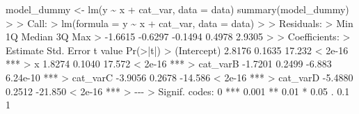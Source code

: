 \documentclass[
  letterpaper,
]{book}
\newenvironment{Shaded}{\begin{snugshade}}{\end{snugshade}}
\newcommand{\AttributeTok}[1]{\textcolor[rgb]{0.40,0.45,0.13}{#1}}
\newcommand{\DecValTok}[1]{\textcolor[rgb]{0.68,0.00,0.00}{#1}}
\newcommand{\ErrorTok}[1]{\textcolor[rgb]{0.68,0.00,0.00}{#1}}
\newcommand{\FloatTok}[1]{\textcolor[rgb]{0.68,0.00,0.00}{#1}}
\newcommand{\FunctionTok}[1]{\textcolor[rgb]{0.28,0.35,0.67}{#1}}
\newcommand{\NormalTok}[1]{\textcolor[rgb]{0.00,0.23,0.31}{#1}}
\newcommand{\OtherTok}[1]{\textcolor[rgb]{0.00,0.23,0.31}{#1}}
\newcommand{\SpecialCharTok}[1]{\textcolor[rgb]{0.37,0.37,0.37}{#1}}
\newcommand{\StringTok}[1]{\textcolor[rgb]{0.13,0.47,0.30}{#1}}
\begin{document}
\begin{Shaded}
\begin{Highlighting}[]
\NormalTok{model\_dummy }\OtherTok{\textless{}{-}} \FunctionTok{lm}\NormalTok{(y }\SpecialCharTok{\textasciitilde{}}\NormalTok{ x }\SpecialCharTok{+}\NormalTok{ cat\_var, }\AttributeTok{data =}\NormalTok{ data)}
\FunctionTok{summary}\NormalTok{(model\_dummy)}
\SpecialCharTok{\textgreater{}} 
\ErrorTok{\textgreater{}}\NormalTok{ Call}\SpecialCharTok{:}
\ErrorTok{\textgreater{}} \FunctionTok{lm}\NormalTok{(}\AttributeTok{formula =}\NormalTok{ y }\SpecialCharTok{\textasciitilde{}}\NormalTok{ x }\SpecialCharTok{+}\NormalTok{ cat\_var, }\AttributeTok{data =}\NormalTok{ data)}
\SpecialCharTok{\textgreater{}} 
\ErrorTok{\textgreater{}}\NormalTok{ Residuals}\SpecialCharTok{:}
\ErrorTok{\textgreater{}}\NormalTok{     Min      }\DecValTok{1}\NormalTok{Q  Median      }\DecValTok{3}\NormalTok{Q     Max }
\SpecialCharTok{\textgreater{}} \SpecialCharTok{{-}}\FloatTok{1.6615} \SpecialCharTok{{-}}\FloatTok{0.6297} \SpecialCharTok{{-}}\FloatTok{0.1494}  \FloatTok{0.4978}  \FloatTok{2.9305} 
\SpecialCharTok{\textgreater{}} 
\ErrorTok{\textgreater{}}\NormalTok{ Coefficients}\SpecialCharTok{:}
\ErrorTok{\textgreater{}}\NormalTok{             Estimate Std. Error t value }\FunctionTok{Pr}\NormalTok{(}\SpecialCharTok{\textgreater{}}\ErrorTok{|}\NormalTok{t}\SpecialCharTok{|}\NormalTok{)    }
\SpecialCharTok{\textgreater{}}\NormalTok{ (Intercept)   }\FloatTok{2.8176}     \FloatTok{0.1635}  \FloatTok{17.232}  \SpecialCharTok{\textless{}} \FloatTok{2e{-}16} \SpecialCharTok{**}\ErrorTok{*}
\ErrorTok{\textgreater{}}\NormalTok{ x             }\FloatTok{1.8274}     \FloatTok{0.1040}  \FloatTok{17.572}  \SpecialCharTok{\textless{}} \FloatTok{2e{-}16} \SpecialCharTok{**}\ErrorTok{*}
\ErrorTok{\textgreater{}}\NormalTok{ cat\_varB     }\SpecialCharTok{{-}}\FloatTok{1.7201}     \FloatTok{0.2499}  \SpecialCharTok{{-}}\FloatTok{6.883} \FloatTok{6.24e{-}10} \SpecialCharTok{**}\ErrorTok{*}
\ErrorTok{\textgreater{}}\NormalTok{ cat\_varC     }\SpecialCharTok{{-}}\FloatTok{3.9056}     \FloatTok{0.2678} \SpecialCharTok{{-}}\FloatTok{14.586}  \SpecialCharTok{\textless{}} \FloatTok{2e{-}16} \SpecialCharTok{**}\ErrorTok{*}
\ErrorTok{\textgreater{}}\NormalTok{ cat\_varD     }\SpecialCharTok{{-}}\FloatTok{5.4880}     \FloatTok{0.2512} \SpecialCharTok{{-}}\FloatTok{21.850}  \SpecialCharTok{\textless{}} \FloatTok{2e{-}16} \SpecialCharTok{**}\ErrorTok{*}
\ErrorTok{\textgreater{}} \SpecialCharTok{{-}{-}{-}}
\ErrorTok{\textgreater{}}\NormalTok{ Signif. codes}\SpecialCharTok{:}  \DecValTok{0} \StringTok{\textquotesingle{}***\textquotesingle{}} \FloatTok{0.001} \StringTok{\textquotesingle{}**\textquotesingle{}} \FloatTok{0.01} \StringTok{\textquotesingle{}*\textquotesingle{}} \FloatTok{0.05} \StringTok{\textquotesingle{}.\textquotesingle{}} \FloatTok{0.1} \StringTok{\textquotesingle{} \textquotesingle{}} \DecValTok{1}

\end{Highlighting}
\end{Shaded}
\end{document}
